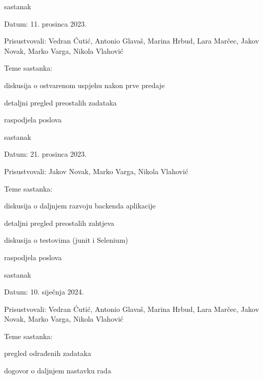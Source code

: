 \begin{packed_enum}
			\item  sastanak
			\item[] \begin{packed_item}
				\item Datum: 11. prosinca 2023.
				\item Prisustvovali: Vedran Ćutić, Antonio Glavaš, Marina Hrbud, Lara Marčec, Jakov Novak, Marko Varga, Nikola Vlahović
				\item Teme sastanka:
				\begin{packed_item}
					\item  diskusija o ostvarenom uspjehu nakon prve predaje
					\item  detaljni pregled preostalih zadataka
					\item  raspodjela poslova
				\end{packed_item}
			\end{packed_item}

			\item  sastanak
			\item[] \begin{packed_item}
				\item Datum: 21. prosinca 2023.
				\item Prisustvovali: Jakov Novak, Marko Varga, Nikola Vlahović
				\item Teme sastanka:
				\begin{packed_item}
					\item  diskusija o daljnjem razvoju backenda aplikacije
					\item  detaljni pregled preostalih zahtjeva
          \item  diskusija o testovima (junit i Selenium)
					\item  raspodjela poslova
				\end{packed_item}
			\end{packed_item}
			
			\item  sastanak
			\item[] \begin{packed_item}
				\item Datum: 10. siječnja 2024.
				\item Prisustvovali: Vedran Ćutić, Antonio Glavaš, Marina Hrbud, Lara Marčec, Jakov Novak, Marko Varga, Nikola Vlahović
				\item Teme sastanka:
				\begin{packed_item}
					\item  pregled odrađenih zadataka
					\item  dogovor o daljnjem nastavku rada
				\end{packed_item}
			\end{packed_item}


\end{packed_enum}
